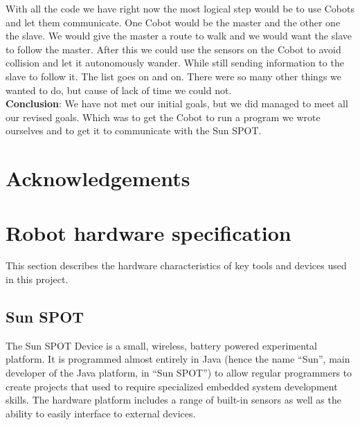 \documentclass[a4paper,10pt]{article} %
\begin{document}
With all the code we have right now the most logical step would be to use Cobots
and let them communicate. One Cobot would be the master and the other one the
slave. We would give the master a route to walk and we would want the slave to
follow the master. After this we could use the sensors on the Cobot to avoid
collision and let it autonomously wander. While still sending information to the
slave to follow it. The list goes on and on. There were so many other things we
wanted to do, but cause of lack of time we could not. \\

\noindent \textbf{Conclusion}: We have not met our initial goals, but we did
managed to meet all our revised goals. Which was to get the Cobot to run a
program we wrote ourselves and to get it to communicate with the Sun SPOT.


\section{Acknowledgements} %



\pagebreak

\appendix

\section{Robot hardware specification} %
\label{app:robot-hardware}

This section describes the hardware characteristics of key tools and devices
used in this project.

\subsection{Sun SPOT} %
\label{app:Sun SPOT}

The Sun SPOT Device is a small, wireless, battery powered experimental platform.
It is programmed almost entirely in Java (hence the name ``Sun'', main developer
of the Java platform, in ``Sun SPOT'') to allow regular programmers to create
projects that used to require specialized embedded system development skills.
The hardware platform includes a range of built-in sensors as well as the
ability to easily interface to external devices.
\end{document}
